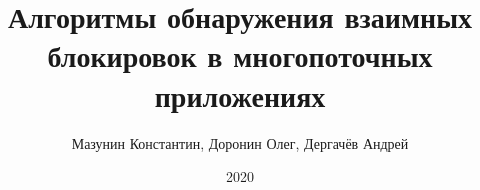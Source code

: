 \title{Алгоритмы обнаружения взаимных блокировок в многопоточных приложениях}
\author{Мазунин Константин, Доронин Олег, Дергачёв Андрей}
\date{2020}

\maketitle

\clearpage
